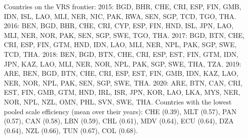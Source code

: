 \documentclass[11pt,letterpaper]{article}
\begin{document}
\begin{table}[htbp]
\vspace{4pt}
{\footnotesize Countries on the VRS frontier: 2015: BGD, BHR, CHE, CRI, ESP, FIN, GMB, IDN, ISL, LAO, MLI, NER, NIC, PAK, RWA, SEN, SGP, TCD, TGO, THA. 2016: BEN, BGD, BHR, CHE, CRI, CYP, ESP, FIN, HND, ISL, JPN, LAO, MLI, NER, NOR, PAK, SEN, SGP, SWE, TGO, THA. 2017: BGD, BTN, CHE, CRI, ESP, FIN, GTM, HND, IDN, LAO, MLI, NER, NPL, PAK, SGP, SWE, TCD, THA. 2018: BEN, BGD, BTN, CHE, CRI, ESP, EST, FIN, GTM, IDN, JPN, KAZ, LAO, MLI, NER, NOR, NPL, PAK, SGP, SWE, THA, TZA. 2019: ARE, BEN, BGD, BTN, CHE, CRI, ESP, EST, FIN, GMB, IDN, KAZ, LAO, NER, NOR, NPL, PAK, SEN, SGP, SWE, THA. 2020: ARE, BTN, CAN, CRI, EST, FIN, GMB, GTM, HND, IRL, ISR, JPN, KOR, LAO, LKA, MYS, NER, NOR, NPL, NZL, OMN, PHL, SVN, SWE, THA. Countries with the lowest pooled scale efficiency (mean over their years): CHE (0.39), MLT (0.57), PAN (0.57), CAN (0.58), LBN (0.59), CHL (0.61), MDV (0.64), ECU (0.64), DZA (0.64), NZL (0.66), TUN (0.67), COL (0.68).}
\end{table}
\end{document}
